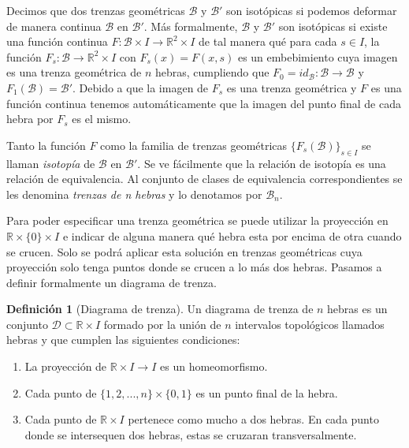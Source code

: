 \documentclass[12pt]{book}
\theoremstyle{definition}
\newtheorem{defi}{Definición}[section]
\begin{document}
Decimos que dos trenzas geométricas $\mathcal{B}$ y $\mathcal{B}'$ son isotópicas si podemos deformar de manera continua $\mathcal{B}$ en $\mathcal{B}'$. Más formalmente, $\mathcal{B}$ y $\mathcal{B}'$ son isotópicas si existe una función continua $F : \mathcal{B} \times I \rightarrow \mathbb{R}^2\times I$ de tal manera qué para cada $s\in I$, la función $F_s : \mathcal{B}\rightarrow \mathbb{R}^2\times I$ con $F_s(x)= F(x,s)$ es un embebimiento cuya imagen es una trenza geométrica de $n$ hebras, cumpliendo que $F_0 = id_{\mathcal{B}}: \mathcal{B}\rightarrow \mathcal{B}$ y $F_1(\mathcal{B}) = \mathcal{B}'$. Debido a que la imagen de $F_s$ es una trenza geométrica y $F$ es una función continua tenemos automáticamente que la imagen del punto final de cada hebra por $F_s$ es el mismo.

Tanto la función $F$ como la familia de trenzas geométricas $\{F_s(\mathcal{B})\}_{s\in I}$ se llaman \textit{isotopía} de $\mathcal{B}$ en $\mathcal{B}'$. Se ve fácilmente que la relación de isotopía es una relación de equivalencia. Al conjunto de clases de equivalencia correspondientes se les denomina \textit{trenzas de n hebras} y lo denotamos por $\mathcal{B}_n$.

Para poder especificar una trenza geométrica se puede utilizar la proyección en $\mathbb{R}\times\{0\}\times I$ e indicar de alguna manera qué hebra esta por encima de otra cuando se crucen. Solo se podrá aplicar esta solución en trenzas geométricas cuya proyección solo tenga puntos donde se crucen a lo más dos hebras. Pasamos a definir formalmente un diagrama de trenza.


\begin{defi}[Diagrama de trenza]\label{diagrama_trenza}
Un diagrama de trenza de $n$ hebras es un conjunto $\mathcal{D}\subset\mathbb{R}\times I$ formado por la unión de $n$ intervalos topológicos llamados hebras y que cumplen las siguientes condiciones: 
\begin{enumerate}
\item La proyección de $\mathbb{R}\times I\rightarrow I$ es un homeomorfismo.
\item Cada punto de $\{1,2,...,n\}\times\{0,1\}$ es un punto final de la hebra.
\item Cada punto de $\mathbb{R}\times I$ pertenece como mucho a dos hebras. En cada punto donde se intersequen dos hebras, estas se cruzaran transversalmente.


\end{enumerate}
\end{defi}
\end{document}
